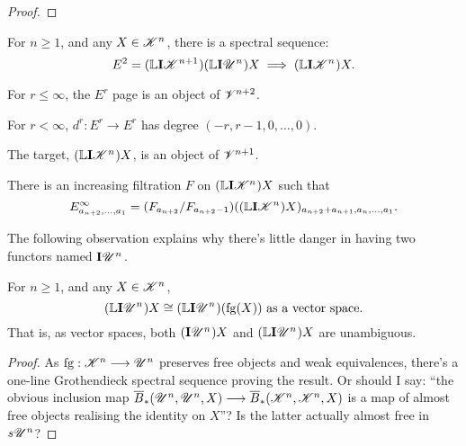 \documentclass[11pt]{article}
\newcommand{\GS}[1]{\scrE^{#1}}
\newcommand{\PRLie}[1]{\scrR^{#1}}%
\newcommand{\LL}[1]{{\scrK}^{#1}}%
\newcommand{\GR}[1]{\scrV^{#1}}%
\newcommand{\nontop}[1]{\scrU^{#1}}%
\newcommand{\PiAlg}[1]{#1\textup{-$\Pi$-alg}}
\newcommand{\Ind}[2][]{\mathbf{I}{#2}_{#1}}%
\newcommand{\forget}{\mathrm{fg}}
\newcommand{\Fr}[2][]{\ifblank{#1}{#2}{#2_{#1}}}
\newcommand{\derived}{\mathbb{L}}
\begin{document}
\begin{GrothendieckSpectralSequences}
\begin{proof}
\end{proof}
\begin{cor*}
For $n\geq1$, and any $X\in\LL{n}$, there is a spectral sequence:
\[E^2=(\derived{\Ind{\LL{n+1}}})(\derived\Ind{\nontop{n}})X\implies(\derived\Ind{\LL{n}})X.\]
\begin{itemise}
\setlength{\parindent}{.25in}
\item For $r\leq\infty$, the $E^r$ page is an object of $\GR{n+2}$.
\item For $r<\infty$, $d^r:E^r\to E^r$ has degree $(-r,r-1,0,\ldots,0)$.
\item The target, $(\derived\Ind{\LL{n}})X$, is an object of $\GR{n+1}$.
\item There is an increasing filtration $F$ on $(\derived\Ind{\LL{n}})X$ such that
\[E^\infty_{a_{n+2},\ldots,a_1}=(F_{a_{n+2}}/F_{a_{n+2}-1})((\derived\Ind{\LL{n}})X)_{a_{n+2}+a_{n+1},a_n,\ldots,a_1}.\]
\end{itemise}
\end{cor*}
The following observation explains why there's little danger in having two functors named $\Ind{\nontop{n}}$.
\begin{lem*}
For $n\geq1$, and any $X\in\LL{n}$,
\[(\derived{\Ind{\nontop{n}}})X\cong(\derived{\Ind{\nontop{n}}})(\forget(X))\textup{ as a vector space.}\]
That is, as vector spaces, both $(\Ind{\nontop{n}})X$ and $(\derived{\Ind{\nontop{n}}})X$ are unambiguous.
\end{lem*}
\begin{proof}
As $\forget:\LL{n}\to\nontop{n}$ preserves free objects and weak equivalences, there's a one-line Grothendieck spectral sequence proving the result. Or should I say: ``the obvious inclusion map $\overline{B}_*(\nontop{n},\nontop{n},X)\to\overline{B}_*(\LL{n},\LL{n},X)$ is a map of almost free objects realising the identity on $X$''? Is the latter actually almost free in $s\nontop{n}$?
\end{proof}
\end{GrothendieckSpectralSequences}
\end{document}
